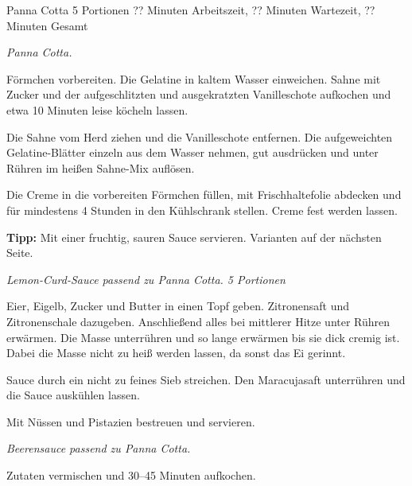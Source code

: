 \begin{recipe}{Panna Cotta} {5 Portionen} {?? Minuten Arbeitszeit, ?? Minuten Wartezeit, ?? Minuten Gesamt}

  \freeform{}\textit{Panna Cotta.}


  Förmchen vorbereiten.
  Die Gelatine in kaltem Wasser einweichen.
  Sahne mit Zucker und der aufgeschlitzten und ausgekratzten Vanilleschote aufkochen und etwa 10 Minuten leise köcheln lassen.

  \newstep{}Die Sahne vom Herd ziehen und die Vanilleschote entfernen.
  Die aufgeweichten Gelatine-Blätter einzeln aus dem Wasser nehmen, gut ausdrücken und unter Rühren im heißen Sahne-Mix auflösen.

  \newstep{}Die Creme in die vorbereiten Förmchen füllen, mit Frischhaltefolie abdecken und für mindestens 4 Stunden in den Kühlschrank stellen.
  Creme fest werden lassen.

  \freeform{}\hrulefill{}

  \freeform{}\textbf{Tipp:}
  Mit einer fruchtig, sauren Sauce servieren. Varianten auf der nächsten Seite.

  \newpage{}

  \freeform{}\hrulefill{}

  \freeform{}\textit{Lemon-Curd-Sauce passend zu Panna Cotta. 5 Portionen}


  Eier, Eigelb, Zucker und Butter in einen Topf geben.
  Zitronensaft und Zitronenschale dazugeben.
  Anschließend alles bei mittlerer Hitze unter Rühren erwärmen.
  Die Masse unterrühren und so lange erwärmen bis sie dick cremig ist.
  Dabei die Masse nicht zu heiß werden lassen, da sonst das Ei gerinnt.

  \newstep{}Sauce durch ein nicht zu feines Sieb streichen.
  Den Maracujasaft unterrühren und die Sauce auskühlen lassen.

  \newstep{}Mit Nüssen und Pistazien bestreuen und servieren.

  \freeform{}\hrulefill{}

  \freeform{}\textit{Beerensauce passend zu Panna Cotta.}


  Zutaten vermischen und 30–45 Minuten aufkochen.

  \freeform{}\hrulefill{}

\end{recipe}
